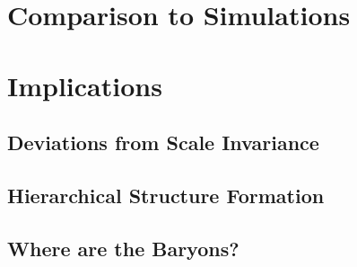 \section{Comparison to Simulations}
\label{sec:Simulations}







\section{Implications}
\label{sec:Implications}

\subsection{Deviations from Scale Invariance}
\label{sec:Implications.Invariance}

\subsection{Hierarchical Structure Formation}
\label{sec:Implications.Hierarchical}

\subsection{Where are the Baryons?}
\label{sec:Implications.Where}
